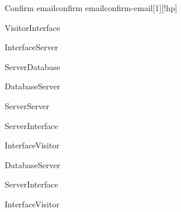 \begin{sdfig}{Confirm email}{confirm email}{confirm-email}[1][!hp]
  \begin{umlcall}[op={Confirm}]{Visitor}{Interface}
    \begin{umlcall}[op={Confirm}]{Interface}{Server}
      \begin{umlcall}[op={Has OTP}]{Server}{Database}
        \begin{umlfragment}[type=alt, label=true]
          \begin{umlcall}[type=return,op={Yes}]{Database}{Server}
            \begin{umlcall}[op={Add cookies}]{Server}{Server}
              \begin{umlcall}[type=return,op={Ok}]{Server}{Interface}
                \begin{umlcall}[type=return,op={Redirect to home}]{Interface}{Visitor}
                \end{umlcall}
              \end{umlcall}
            \end{umlcall}
          \end{umlcall}
          \umlfpart[else]
          \begin{umlcall}[type=return,op={No}]{Database}{Server}
            \begin{umlcall}[type=return,op={Error}]{Server}{Interface}
              \begin{umlcall}[type=return,op={Show error}]{Interface}{Visitor}
              \end{umlcall}
            \end{umlcall}
          \end{umlcall}
        \end{umlfragment}
      \end{umlcall}
    \end{umlcall}
  \end{umlcall}
\end{sdfig}

